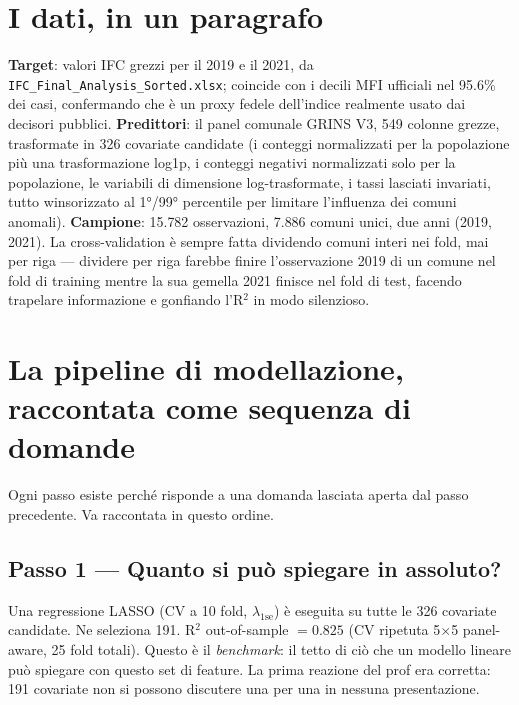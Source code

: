 \documentclass[11pt,a4paper]{article}
\begin{document}
\section{I dati, in un paragrafo}

\textbf{Target}: valori IFC grezzi per il 2019 e il 2021, da
\texttt{IFC\_Final\_Analysis\_Sorted.xlsx}; coincide con i decili
MFI ufficiali nel 95.6\% dei casi, confermando che è un proxy
fedele dell'indice realmente usato dai decisori pubblici.
\textbf{Predittori}: il panel comunale GRINS V3, 549 colonne grezze,
trasformate in 326 covariate candidate (i conteggi normalizzati per
la popolazione più una trasformazione log1p, i conteggi negativi
normalizzati solo per la popolazione, le variabili di dimensione
log-trasformate, i tassi lasciati invariati, tutto winsorizzato al
1°/99° percentile per limitare l'influenza dei comuni anomali).
\textbf{Campione}: 15{.}782 osservazioni, 7{.}886 comuni unici, due
anni (2019, 2021). La cross-validation è sempre fatta dividendo
comuni interi nei fold, mai per riga --- dividere per riga farebbe
finire l'osservazione 2019 di un comune nel fold di training mentre
la sua gemella 2021 finisce nel fold di test, facendo trapelare
informazione e gonfiando l'R$^2$ in modo silenzioso.

\section{La pipeline di modellazione, raccontata come sequenza di
domande}

Ogni passo esiste perché risponde a una domanda lasciata aperta dal
passo precedente. Va raccontata in questo ordine.

\subsection*{Passo 1 --- Quanto si può spiegare in assoluto?}
Una regressione LASSO (CV a 10 fold, $\lambda_{\text{1se}}$) è
eseguita su tutte le 326 covariate candidate. Ne seleziona 191.
R$^2$ out-of-sample $= 0.825$ (CV ripetuta 5$\times$5
panel-aware, 25 fold totali). Questo è il \emph{benchmark}: il
tetto di ciò che un modello lineare può spiegare con questo set di
feature. La prima reazione del prof era corretta: 191 covariate non
si possono discutere una per una in nessuna presentazione.
\end{document}
